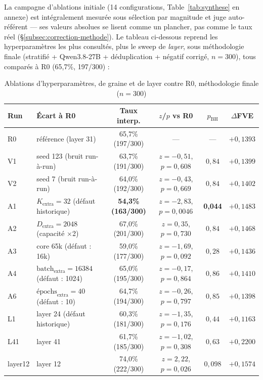 \documentclass[11pt]{article}
\begin{document}
La campagne d'ablations initiale (14 configurations, Table~\ref{tab:synthese}
en annexe) est intégralement mesurée sous sélection par magnitude et juge
auto-référent --- ses valeurs absolues se lisent comme un plancher, pas comme
le taux réel (\S\ref{subsec:correction-methode}). Le tableau ci-dessous reprend les
hyperparamètres les plus consultés, plus le sweep de \emph{layer}, sous
méthodologie finale (stratifié + Qwen3.8-27B + déduplication + négatif
corrigé, $n=300$), tous comparés à R0 (65,7\%, 197/300) :

\begin{table}[h!]
\centering
\caption{Ablations d'hyperparamètres, de graine et de layer contre R0, méthodologie finale ($n=300$)}
\label{tab:ablations-finales}
\vspace{0.4em}\small
\begin{tabular}{@{}llcccc@{}}
\toprule
\textbf{Run} & \textbf{Écart à R0} & \textbf{Taux interp.} & \textbf{$z$/$p$ vs R0} & \textbf{$p_\text{BH}$} & \textbf{$\Delta$FVE} \\ \midrule
R0 & référence (layer 31) & 65,7\% (197/300) & --- & --- & $+0{,}1393$ \\
V1 & seed 123 (bruit run-à-run) & 63,7\% (191/300) & $z=-0{,}51$, $p=0{,}608$ & $0{,}84$ & $+0{,}1399$ \\
V2 & seed 7 (bruit run-à-run) & 64,0\% (192/300) & $z=-0{,}43$, $p=0{,}669$ & $0{,}84$ & $+0{,}1402$ \\
A1 & $K_\text{extra}=32$ (défaut historique) & \textbf{54,3\% (163/300)} & $z=-2{,}83$, $p=0{,}0046$ & \textbf{0,044} & $+0{,}1483$ \\
A2 & $D_\text{extra}=2048$ (capacité $\times$2) & 67,0\% (201/300) & $z=0{,}35$, $p=0{,}730$ & $0{,}84$ & $+0{,}1468$ \\
A3 & core 65k (défaut : 16k) & 59,0\% (177/300) & $z=-1{,}69$, $p=0{,}092$ & $0{,}28$ & $+0{,}1436$ \\
A4 & $\text{batch}_\text{extra}=16384$ (défaut : 1024) & 65,0\% (195/300) & $z=-0{,}17$, $p=0{,}864$ & $0{,}86$ & $+0{,}1410$ \\
A6 & $\text{épochs}_\text{extra}=40$ (défaut : 10) & 64,7\% (194/300) & $z=-0{,}26$, $p=0{,}797$ & $0{,}85$ & $+0{,}1398$ \\
L1 & layer 24 (défaut historique) & 60,3\% (181/300) & $z=-1{,}35$, $p=0{,}176$ & $0{,}44$ & $+0{,}1163$ \\
L41 & layer 41 & 61,7\% (185/300) & $z=-1{,}02$, $p=0{,}308$ & $0{,}63$ & $+0{,}2200$ \\
layer12 & layer 12 & 74,0\% (222/300) & $z=2{,}22$, $p=0{,}026$ & $0{,}098$ & $+0{,}1574$ \\
\bottomrule
\end{tabular}
\end{table}
\end{document}
